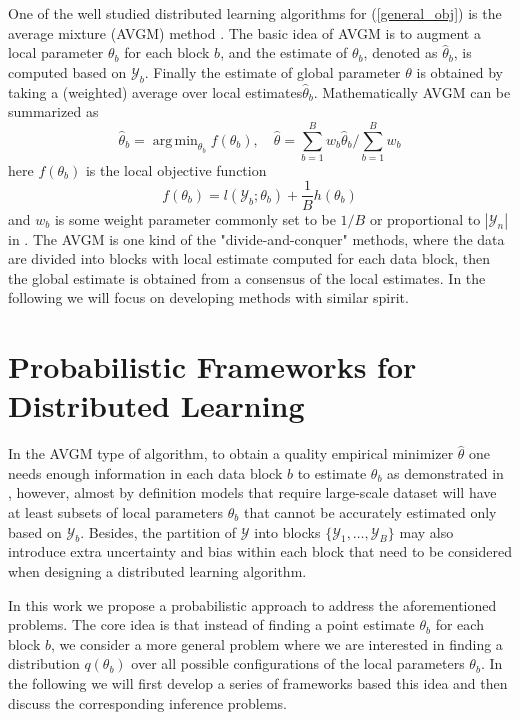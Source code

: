 \documentclass{article}
\DeclareMathOperator*{\argmin}{arg\,min}
\newcommand{\1}[0]{\ensuremath{\boldsymbol{1}}\xspace}
\begin{document}
One of the well studied distributed learning algorithms for (\ref{general_obj}) is the average mixture (AVGM) method \cite{Mann2009, Zinkevich2010, YZhang2012}. The basic idea of AVGM is to augment a local parameter $\theta_b$ for each block $b$, and the estimate of $\theta_b$, denoted as $\hat\theta_b$, is computed based on $\mathcal{Y}_b$. Finally the estimate of global parameter $\theta$ is obtained by taking a (weighted) average over local estimates$\hat\theta_b$. Mathematically AVGM can be summarized as
\begin{equation}\label{avgm}
\hat\theta_b = \textstyle\argmin_{\theta_b}f(\theta_b), \quad \hat\theta = \textstyle\sum_{b=1}^B w_b\hat\theta_b/\sum_{b=1}^Bw_b
\end{equation} 
here $f(\theta_b)$ is the local objective function
\begin{equation}\label{avgm_local}
f(\theta_b) = l(\mathcal{Y}_b; \theta_b)+\frac{1}{B}h(\theta_b)
\end{equation}
and $w_b$ is some weight parameter commonly set to be $1/B$ \cite{Mann2009, Zinkevich2010} or proportional to $|\mathcal{Y}_n|$ in \cite{YZhang2012}. The AVGM is one kind of the "divide-and-conquer" methods, where the data are divided into blocks with local estimate computed for each data block, then the global estimate is obtained from a consensus of the local estimates. In the following we will focus on developing methods with similar spirit.

\section{Probabilistic Frameworks for Distributed Learning}\label{proposed_frameworks}

In the AVGM type of algorithm, to obtain a quality empirical minimizer $\hat\theta$ one needs enough information in each data block $b$ to estimate $\theta_b$ as demonstrated in \cite{YZhang2012}, however, almost by definition models that require large-scale dataset will have at least subsets of local parameters $\theta_b$ that cannot be accurately estimated only based on $\mathcal{Y}_b$. Besides, the partition of $\mathcal{Y}$ into blocks $\{\mathcal{Y}_1, \ldots, \mathcal{Y}_B\}$ may also introduce extra uncertainty and bias within each block that need to be considered when designing a distributed learning algorithm. 

In this work we propose a probabilistic approach to address the aforementioned problems. The core idea is that instead of finding a point estimate $\theta_b$ for each block $b$, we consider a more general problem where we are interested in finding a distribution $q(\theta_b)$ over all possible configurations of the local parameters $\theta_b$. In the following we will first develop a series of frameworks based this idea and then discuss the corresponding inference problems.
\end{document}
